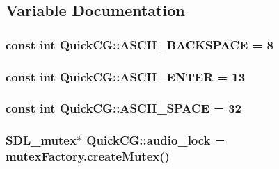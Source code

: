 \subsection{Variable Documentation}
\hypertarget{namespaceQuickCG_a1471d38830e46d9549694c38f89f2a33}{
\subsubsection[{A\-S\-C\-I\-I\-\_\-\-B\-A\-C\-K\-S\-P\-A\-C\-E}]{\setlength{\rightskip}{0pt plus 5cm}const int Quick\-C\-G\-::\-A\-S\-C\-I\-I\-\_\-\-B\-A\-C\-K\-S\-P\-A\-C\-E = 8}}\label{namespaceQuickCG_a1471d38830e46d9549694c38f89f2a33}
\hypertarget{namespaceQuickCG_a653347727493ee70ad64734222449ab6}{
\subsubsection[{A\-S\-C\-I\-I\-\_\-\-E\-N\-T\-E\-R}]{\setlength{\rightskip}{0pt plus 5cm}const int Quick\-C\-G\-::\-A\-S\-C\-I\-I\-\_\-\-E\-N\-T\-E\-R = 13}}\label{namespaceQuickCG_a653347727493ee70ad64734222449ab6}
\hypertarget{namespaceQuickCG_ab7680b1029dfc3e65d17e184d26698c5}{
\subsubsection[{A\-S\-C\-I\-I\-\_\-\-S\-P\-A\-C\-E}]{\setlength{\rightskip}{0pt plus 5cm}const int Quick\-C\-G\-::\-A\-S\-C\-I\-I\-\_\-\-S\-P\-A\-C\-E = 32}}\label{namespaceQuickCG_ab7680b1029dfc3e65d17e184d26698c5}
\hypertarget{namespaceQuickCG_aebfd1d5f928c98978dd58d6a640356b3}{
\subsubsection[{audio\-\_\-lock}]{\setlength{\rightskip}{0pt plus 5cm}S\-D\-L\-\_\-mutex$\ast$ Quick\-C\-G\-::audio\-\_\-lock = mutex\-Factory.\-create\-Mutex()}}\label{namespaceQuickCG_aebfd1d5f928c98978dd58d6a640356b3}
